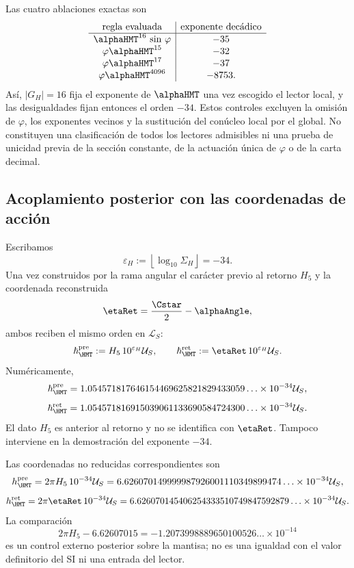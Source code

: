 Las cuatro ablaciones exactas son
\[
\begin{array}{c|c}
\text{regla evaluada}&\text{exponente decádico}\\
\hline
\alphaHMT^{16}\ \text{sin }\varphi&-35\\
\varphi\alphaHMT^{15}&-32\\
\varphi\alphaHMT^{17}&-37\\
\varphi\alphaHMT^{4096}&-8753.
\end{array}
\]
Así, \(|G_H|=16\) fija el exponente de \(\alphaHMT\) una vez escogido el
lector local, y las desigualdades fijan entonces el orden \(-34\). Estos
controles excluyen la omisión de \(\varphi\), los exponentes vecinos y la
sustitución del conúcleo local por el global. No constituyen una
clasificación de todos los lectores admisibles ni una prueba de unicidad
previa de la sección constante, de la actuación única de \(\varphi\) o de la
carta decimal.

\subsection{Acoplamiento posterior con las coordenadas de acción}

Escribamos
\[
\varepsilon_H:=\left\lfloor\log_{10}\Sigma_H\right\rfloor=-34.
\]
Una vez construidos por la rama angular el carácter previo al retorno \(H_5\)
y la coordenada reconstruida
\[
\etaRet=\frac{\Cstar}{2}-\alphaAngle,
\]
ambos reciben el mismo orden en \(\mathcal L_S\):
\[
\hbar_{\HMT}^{\rm pre}
:=H_5\,10^{\varepsilon_H}\mathcal U_S,
\qquad
\hbar_{\HMT}^{\rm ret}
:=\etaRet\,10^{\varepsilon_H}\mathcal U_S.
\]
Numéricamente,
\[
\hbar_{\HMT}^{\rm pre}
=1.054571817646154469625821829433059\ldots
\times10^{-34}\mathcal U_S,
\]
\[
\hbar_{\HMT}^{\rm ret}
=1.054571816915039061133690584724300\ldots
\times10^{-34}\mathcal U_S.
\]
El dato \(H_5\) es anterior al retorno y no se identifica con \(\etaRet\).
Tampoco interviene en la demostración del exponente \(-34\).

Las coordenadas no reducidas correspondientes son
\[
h_{\HMT}^{\rm pre}
=2\pi H_5\,10^{-34}\mathcal U_S
=6.626070149999987926001110349899474\ldots
\times10^{-34}\mathcal U_S,
\]
\[
h_{\HMT}^{\rm ret}
=2\pi\etaRet\,10^{-34}\mathcal U_S
=6.626070145406254333510749847592879\ldots
\times10^{-34}\mathcal U_S.
\]
La comparación
\[
2\pi H_5-6.62607015
=-1.2073998889650100526\ldots\times10^{-14}
\]
es un control externo posterior sobre la mantisa; no es una igualdad con el
valor definitorio del SI ni una entrada del lector.

